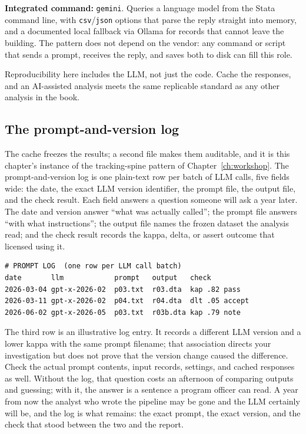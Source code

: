 \begin{kaobox}[frametitle=Package Integration: \texttt{gemini}]
\textbf{Integrated command:} \texttt{gemini}. Queries a language model from the Stata command line, with \texttt{csv}/\texttt{json} options that parse the reply straight into memory, and a documented local fallback via Ollama for records that cannot leave the building. The pattern does not depend on the vendor: any command or script that sends a prompt, receives the reply, and saves both to disk can fill this role.
\end{kaobox}

Reproducibility here includes the LLM, not just the code. Cache the responses, and an AI-assisted analysis meets the same replicable standard as any other analysis in the book.

\subsection{The prompt-and-version log}\label{ch13-sc-promptlog}
The cache freezes the results; a second file makes them auditable, and it is this chapter's instance of the tracking-spine pattern of Chapter~\ref{ch:workshop}. The prompt-and-version log is one plain-text row per batch of LLM calls, five fields wide: the date, the exact LLM version identifier, the prompt file, the output file, and the check result. Each field answers a question someone will ask a year later. The date and version answer \enquote{what was actually called}; the prompt file answers \enquote{with what instructions}; the output file names the frozen dataset the analysis read; and the check result records the kappa, delta, or assert outcome that licensed using it.
\par
{\footnotesize
\begin{verbatim}
# PROMPT LOG  (one row per LLM call batch)
date       llm            prompt   output   check
2026-03-04 gpt-x-2026-02  p03.txt  r03.dta  kap .82 pass
2026-03-11 gpt-x-2026-02  p04.txt  r04.dta  dlt .05 accept
2026-06-02 gpt-x-2026-05  p03.txt  r03b.dta kap .79 note
\end{verbatim}
}
The third row is an illustrative log entry. It records a different LLM version and a lower kappa with the same prompt filename; that association directs your investigation but does not prove that the version change caused the difference. Check the actual prompt contents, input records, settings, and cached responses as well. Without the log, that question costs an afternoon of comparing outputs and guessing; with it, the answer is a sentence a program officer can read. A year from now the analyst who wrote the pipeline may be gone and the LLM certainly will be, and the log is what remains: the exact prompt, the exact version, and the check that stood between the two and the report.

